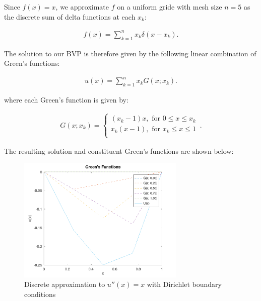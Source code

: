 \begin{solution}\ \\\\
    Since $f(x) = x$, we approximate $f$ on a uniform gride with mesh size $n=5$ as the discrete sum of delta 
    functions at each $x_k$:

    \begin{align*}
        f(x) = \sum\limits_{k=1}^{n}{x_k}\delta(x - x_k).
    \end{align*}

    The solution to our BVP is therefore given by the following linear combination of Green's functions:
    
    \begin{align*}
        u(x) = \sum\limits_{k=1}^{n}{x_k}G(x; x_k).
    \end{align*}

    where each Green's function is given by:

    \begin{align*}
        G(x; x_k) = \begin{cases}
            (x_k - 1)x, \text{ for } 0 \le x \le x_k \\
            x_k(x - 1), \text{ for } x_k \le x \le 1 \\
        \end{cases}\, .
    \end{align*}

    The resulting solution and constituent Green's functions are shown below:

    \begin{figure}[h]
        \includegraphics[width=8cm]{problem1c_discrete_approx.png}
        \centering
        \caption{Discrete approximation to $u''(x)=x$ with Dirichlet boundary conditions}
    \end{figure}


\end{solution}